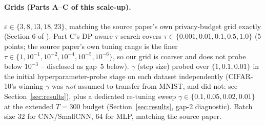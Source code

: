 \documentclass{article}
\begin{document}
\paragraph{Grids (Parts A--C of this scale-up).} $\varepsilon\in\{3,8,13,18,23\}$,
matching the source paper's own privacy-budget grid exactly (Section 6 of
\citealt{islamov2026byzclip}). Part C's DP-aware $\tau$ search covers
$\tau\in\{0.001,0.01,0.1,0.5,1.0\}$ (5 points; the source paper's own tuning
range is the finer $\tau\in\{1,10^{-1},10^{-2},10^{-4},10^{-5},10^{-6}\}$, so
our grid is coarser and does not probe below $10^{-3}$ -- disclosed as gap~5
below). $\gamma$ (step size) probed over $\{1,0.1,0.01\}$ in the initial
hyperparameter-probe stage on each dataset independently (CIFAR-10's winning
$\gamma$ was \emph{not} assumed to transfer from MNIST, and did not: see
Section~\ref{sec:results}), plus a dedicated re-tuning sweep
$\gamma\in\{0.1,0.05,0.02,0.01\}$ at the extended $T{=}300$ budget
(Section~\ref{sec:results}, gap-2 diagnostic). Batch size 32 for CNN/SmallCNN,
64 for MLP, matching the source paper.
\end{document}
